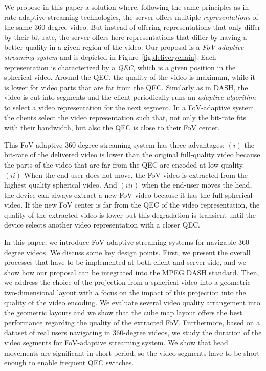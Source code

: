 We propose in this paper a solution where, following the same principles as in
rate-adaptive streaming technologies, the server offers multiple \emph{representations}
of the same 360-degree video. But instead of offering representations that only differ by
their bit-rate, the server offers here representations that differ by
having a better quality in a given region of the video.
Our proposal is a \emph{FoV-adaptive streaming system} and is depicted in Figure~\ref{fig:deliverychain}.
Each representation is characterized by a \emph{\ac{QEC}}, which is a given
position in the spherical video. Around the \ac{QEC}, the quality of the video is maximum,
while it is lower for video parts that are far from the \ac{QEC}. Similarly as
in \ac{DASH}, the video is cut into segments and the client periodically runs
an \emph{adaptive algorithm} to select
a video representation for the next segment. In a \ac{FoV}-adaptive system, the clients select
the video representation such that, not only the bit-rate fits with their bandwidth, but also
the \ac{QEC} is close to their \ac{FoV} center.



This \ac{FoV}-adaptive 360-degree streaming system has three advantages:
$(i)$ the bit-rate of the delivered video is lower than the original full-quality video because the
parts of the video that are far from the \ac{QEC} are encoded at low quality.
$(ii)$ When the end-user does not move, the \ac{FoV} video is extracted from the highest
quality spherical video.
And $(iii)$ when the end-user moves the head, the device can
always extract
a new \ac{FoV} video because it has the full spherical video. If the
new \ac{FoV} center is far from the
\ac{QEC} of the video representation, the quality of the extracted video is lower but this
degradation is transient until the
device selects another video representation with a closer \ac{QEC}.

In this paper, we introduce \ac{FoV}-adaptive streaming systems for navigable 360-degree
videos. We discuss some key design points. First, we present the overall processes that have to
be implemented at both client and server side, and we show how our proposal can be integrated
into the MPEG \ac{DASH} standard. Then, we address
the choice of the projection from a spherical video into a geometric two-dimensional layout
with a focus on the impact of this projection into the quality of the video encoding. We evaluate
several video quality arrangement into the geometric layouts and we show that the
cube map layout offers the best performance regarding the quality of the extracted
\ac{FoV}.
Furthermore, based on a dataset of
real users navigating in 360-degree videos, we study the duration of the video segments
for \ac{FoV}-adaptive streaming system. We show that head movements are significant
in short period, so the video segments have to be short enough to enable
frequent \ac{QEC} switches.

